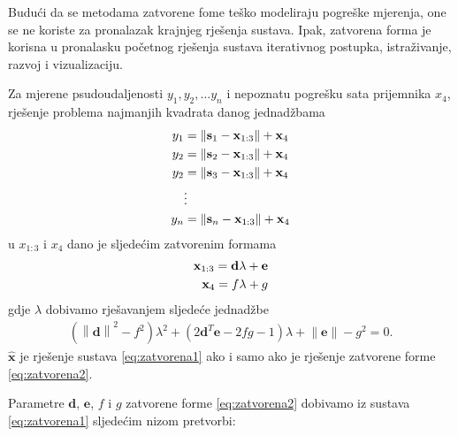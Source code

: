 \documentclass[a4paper,twoside,12pt]{memoir} %
\begin{document}
Budući da se metodama zatvorene fome teško modeliraju pogreške mjerenja,
one se ne koriste za pronalazak krajnjeg rješenja sustava.
Ipak,
zatvorena forma je korisna u pronalasku početnog rješenja sustava iterativnog postupka, istraživanje, razvoj i vizualizaciju.


Za mjerene psudoudaljenosti $y_1,y_2, \hdots y_n$ i nepoznatu pogrešku sata prijemnika $x_4$, rješenje 
problema najmanjih kvadrata danog jednadžbama
\begin{align}\label{eq:zatvorena1}
y_1 &= \left \| \mathbf{s}_1 - \mathbf{x}_{1:3} \right \| + \mathbf{x}_{4} \notag \\
y_2 &= \left \| \mathbf{s}_2 - \mathbf{x}_{1:3} \right \| + \mathbf{x}_{4} \notag \\
y_2 &= \left \| \mathbf{s}_3 - \mathbf{x}_{1:3} \right \| + \mathbf{x}_{4} \\
&\vdots \notag \\
y_n &= \left \| \mathbf{s}_n - \mathbf{x}_{1:3} \right \| + \mathbf{x}_{4} \notag 
\end{align}
u $x_{1:3}$ i $x_4$ dano je sljedećim zatvorenim formama
\begin{align}\label{eq:zatvorena2}
	\mathbf{x}_{1:3} = \mathbf{d}\lambda + \mathbf{e} \notag \\
	\mathbf{x}_{4} = f\lambda + g
\end{align}
gdje $\lambda$ dobivamo rješavanjem sljedeće jednadžbe
\begin{align*}
	( \left \|\mathbf{d}\right \|^2 - f^2 ) \lambda^2 + (2\mathbf{d}^T \mathbf{e} - 2fg - 1)\lambda + \left \|\mathbf{e}\right \| - g^2 = 0.
\end{align*}
 $\hat{\mathbf{x}}$ je rješenje sustava \ref{eq:zatvorena1} ako i samo ako je
rješenje zatvorene forme \ref{eq:zatvorena2}.

Parametre $\mathbf{d}$, $\mathbf{e}$, $f$ i $g$ zatvorene forme \ref{eq:zatvorena2} dobivamo iz sustava \ref{eq:zatvorena1}
sljedećim nizom pretvorbi: \\
\end{document}
